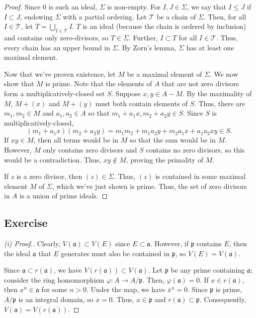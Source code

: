 \begin{proof}
Since $0$ is such an ideal, $\Sigma$ is non-empty. For $I,J \in \Sigma$, we say that $I \le J$ if $I \subset J$, endowing $\Sigma$ with a 
partial ordering. Let $\mathcal{T}$ be a chain of $\Sigma$. Then, for all $I \in \mathcal{T}$, let $T = \bigcup_{I \in \mathcal{T}}I$. $T$ is
an ideal (because the chain is ordered by inclusion) and contains only zero-divisors, so $T \in \Sigma$. Further, $I \subset T$ for all 
$I \in \mathcal{T}$. Thus, every chain has an upper bound in $\Sigma$. By Zorn's lemma, $\Sigma$ has at least one maximal element.

Now that we've proven existence, let $M$ be a maximal element of $\Sigma$. We now show that $M$ is prime. Note that the elements of $A$ that are not
zero divisors form a multiplicatively-closed set $S$. Suppose $x,y \in A - M$. By the maximality of $M$, $M + (x)$ and $M + (y)$ must both contain
elements of $S$. Thus, there are $m_1,m_2 \in M$ and $a_1,a_2 \in A$ so that $m_1 + a_1 x, m_2 + a_2 y \in S$. Since $S$
is multiplicatively-closed,
$$(m_1 + a_1 x)(m_2 + a_2 y) = m_1m_2 + m_1 a_2 y + m_2 a_1 x + a_1 a_2 xy \in S.$$
If $xy \in M$, then all terms would be in $M$ so that the sum would be in $M$. However, $M$ only contains zero divisors and $S$ contains no zero divisors,
so this would be a contradiction. Thus, $xy \not\in M$, proving the primality of $M$.

If $z$ is a zero divisor, then $(z) \in \Sigma$. Thus, $(z)$ is contained in some maximal element $M$ of $\Sigma$, which we've just shown is prime. Thus,
the set of zero divisors in $A$ is a union of prime ideals.
\end{proof}

\subsection{Exercise}\label{1.15}

\begin{proof}[(i) Proof.]
Clearly, $V(\mathfrak{a}) \subset V(E)$ since $E \subset \mathfrak{a}$. However, if $\mathfrak{p}$ contains $E$, then the ideal $\mathfrak{a}$ that $E$ 
generates must also be contained in $\mathfrak{p}$, so $V(E) = V(\mathfrak{a})$.

Since $\mathfrak{a} \subset r(\mathfrak{a})$, we have $V(r(\mathfrak{a})) \subset V(\mathfrak{a})$. Let $\mathfrak{p}$ be any prime containing $\mathfrak{a}$;
consider the ring homomorphism $\varphi: A \to A/\mathfrak{p}$. Then, $\varphi(\mathfrak{a}) = 0$. If $x \in r(\mathfrak{a})$, then $x^n \in \mathfrak{a}$
for some $n > 0$. Under the map, we have $\overline{x}^n = 0$. Since $\mathfrak{p}$ is prime, $A/\mathfrak{p}$ is an integral domain, so $\overline{x} = 0$.
Thus, $x \in \mathfrak{p}$ and $r(\mathfrak{a}) \subset \mathfrak{p}$. Consequently, $V(\mathfrak{a}) = V(r(\mathfrak{a}))$.
\end{proof}

